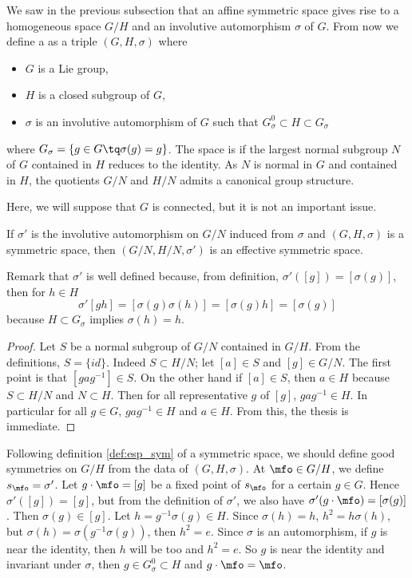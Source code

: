 We saw in the previous subsection that an affine symmetric space gives rise to a homogeneous space $G/H$ and an involutive automorphism $\sigma$ of $G$. From now we define a  as a triple $(G,H,\sigma)$ where

\begin{itemize}
\item $G$ is a Lie group,
\item $H$ is a closed subgroup of $G$,
\item $\sigma$ is an involutive automorphism of $G$ such that $G_{\sigma}^0\subset H\subset G_{\sigma}$
\end{itemize}
where $G_{\sigma}=\{g\in G\tq \sigma(g)=g\}$. The space is  if the largest normal subgroup $N$ of $G$ contained in $H$ reduces to the identity. As $N$ is normal in $G$ and contained in $H$, the quotients $G/N$ and $H/N$ admits a canonical group structure. 

Here, we will suppose that $G$ is connected, but it is not an important issue.

\begin{proposition}
If $\sigma'$ is the involutive automorphism on $G/N$ induced from $\sigma$ and $(G,H,\sigma)$ is a symmetric space, then $(G/N,H/N,\sigma')$ is an effective symmetric space.
\end{proposition}

Remark that $\sigma'$ is well defined because, from definition, $\sigma'([g])=[\sigma(g)]$, then for $h\in H$
\begin{equation}
\sigma'[gh]=[\sigma(g)\sigma(h)]
           =[\sigma(g)h]
           =[\sigma(g)]
\end{equation}
because $H\subset G_{\sigma}$ implies $\sigma(h)=h$.

\begin{proof}
Let $S$ be a normal subgroup of $G/N$ contained in $G/H$. From the definitions, $S=\{id\}$. Indeed $S\subset H/N$; let $[a]\in S$ and $[g]\in G/N$. The first point is that $[gag^{-1}]\in S$. On the other hand if $[a]\in S$, then $a\in H$ because $S\subset H/N$ and $N\subset H$. Then for all representative $g$ of $[g]$, $gag^{-1}\in H$. In particular for all $g\in G$, $gag^{-1}\in H$ and $a\in H$. From this, the thesis is immediate.
\end{proof}

Following definition \ref{def:esp_sym} of a symmetric space, we should define good symmetries on $G/H$ from the data of $(G,H,\sigma)$. At $\mfo\in G/H$, we define $s_{\mfo}=\sigma'$. Let $g\cdot\mfo=[g]$ be a fixed point of $s_{\mfo}$ for a certain $g\in G$. Hence $\sigma'([g])=[g]$, but from the definition of $\sigma'$, we also have $\sigma'(g\cdot \mfo)=[\sigma(g)]$. Then $\sigma(g)\in[g]$. Let $h=g^{-1}\sigma(g)\in H$. Since $\sigma(h)=h$, $h^2=h\sigma(h)$, but $\sigma(h)=\sigma(g^{-1}\sigma(g))$, then $h^2=e$.
Since $\sigma$ is an automorphism, if $g$ is near the identity, then $h$ will be too and $h^2=e$. So $g$ is near the identity and invariant under $\sigma$, then $g\in G_{\sigma}^0\subset H$ and $g\cdot\mfo=\mfo$.

